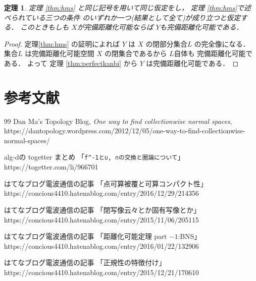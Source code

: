 \documentclass[leqno, a4paper, 12pt]{jsarticle}
\newtheorem{thm}{定理}
\begin{document}
\begin{thm}
定理
\ref{thm:hms}
と同じ記号を用いて同じ仮定をし，
定理
\ref{thm:hms}で述べられている三つの条件
のいずれか一つ(結果として全て)が成り立つと仮定する．
このときもしも
$X$が完備距離化可能ならば
$Y$も完備距離化可能である．
\end{thm}
\begin{proof}
定理\ref{thm:hms}
の証明によれば
$Y$
は
$X$
の閉部分集合$L$
の完全像になる．
集合$L$
は完備距離化可能空間
$X$
の閉集合であるから
$L$自体も
完備距離化可能である．
よって
定理
\ref{thm:perfectkanbi}
から
$Y$
は完備距離化可能である．
\end{proof}





\section*{参考文献}


\renewcommand{\refname}{参考にしたウェブページ}

\begin{thebibliography}{99}
Dan Ma's Topology Blog, 
\textit{One way to find collectionwise normal spaces}, 
https://dantopology.wordpress.com/2012/12/05/one-way-to-find-collectionwise-normal-spaces/


alg-dの
togetter まとめ
「\verb|f^-1と∪, ∩の交換と圏論について|」
https://togetter.com/li/966701

はてなブログ電波通信の記事
「点可算被覆と可算コンパクト性」
https://concious4410.hatenablog.com/entry/2016/12/29/214356

はてなブログ電波通信の記事
「閉写像云々とか固有写像とか」
https://concious4410.hatenablog.com/entry/2015/11/06/205115

はてなブログ電波通信の記事
「距離化可能定理 part $-1$:BNS」
https://concious4410.hatenablog.com/entry/2016/01/22/132906


はてなブログ電波通信の記事
「正規性の特徴付け」
https://concious4410.hatenablog.com/entry/2015/12/21/170610


\end{thebibliography}



\renewcommand{\refname}{一般の参考文献}
\nocite{*}


\end{document}

